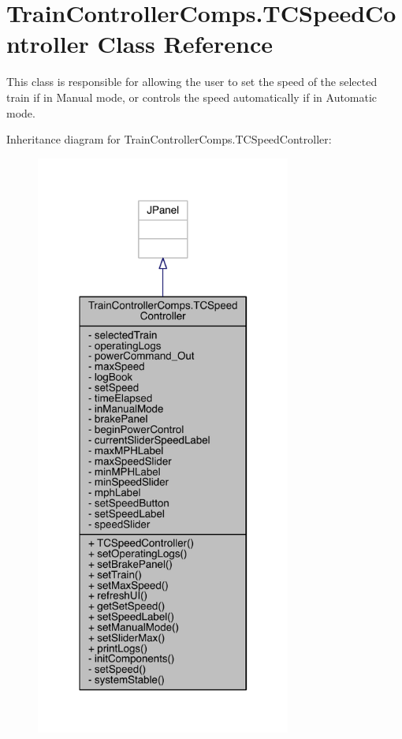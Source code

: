 \hypertarget{classTrainControllerComps_1_1TCSpeedController}{}\section{Train\+Controller\+Comps.\+T\+C\+Speed\+Controller Class Reference}
\label{classTrainControllerComps_1_1TCSpeedController}


This class is responsible for allowing the user to set the speed of the selected train if in Manual mode, or controls the speed automatically if in Automatic mode.  




Inheritance diagram for Train\+Controller\+Comps.\+T\+C\+Speed\+Controller\+:
\nopagebreak
\begin{figure}[H]
\begin{center}
\leavevmode
\includegraphics[width=238pt]{classTrainControllerComps_1_1TCSpeedController__inherit__graph}
\end{center}
\end{figure}


